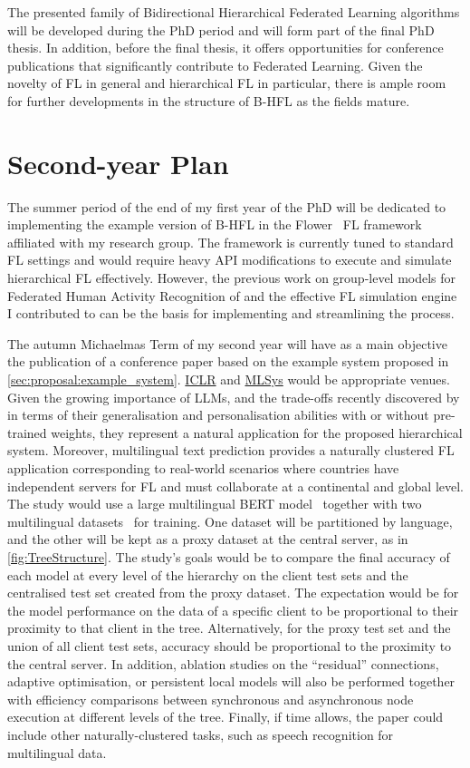 
The presented family of Bidirectional Hierarchical Federated Learning algorithms will be developed during the PhD period and will form part of the final PhD thesis. In addition, before the final thesis, it offers opportunities for conference publications that significantly contribute to Federated Learning. Given the novelty of FL in general and hierarchical FL in particular, there is ample room for further developments in the structure of B-HFL as the fields mature.

\section{Second-year Plan}\label{sec:timeplan:secondYear}
The summer period of the end of my first year of the PhD will be dedicated to implementing the example version of B-HFL in the Flower~\citep{Flower} FL framework affiliated with my research group. The framework is currently tuned to standard FL settings and would require heavy API modifications to execute and simulate hierarchical FL effectively. However, the previous work on group-level models for Federated Human Activity Recognition of \citet{OperaWorkshop} and the effective FL simulation engine I contributed to can be the basis for implementing and streamlining the process.

The autumn Michaelmas Term of my second year will have as a main objective the publication of a conference paper based on the example system proposed in \cref{sec:proposal:example_system}. \href{https://iclr.cc/}{ICLR} and \href{https://mlsys.org/}{MLSys} would be appropriate venues. Given the growing importance of LLMs, and the trade-offs recently discovered by \citet{PersonalisationGeneralisationTradeoff} in terms of their generalisation and personalisation abilities with or without pre-trained weights, they represent a natural application for the proposed hierarchical system. Moreover, multilingual text prediction provides a naturally clustered FL application corresponding to real-world scenarios where countries have independent servers for FL and must collaborate at a continental and global level. The study would use a large multilingual BERT model~\citep{RoBERTA} together with two multilingual datasets~\citep[e.g., ][]{XGLUE,mC4} for training. One dataset will be partitioned by language, and the other will be kept as a proxy dataset at the central server, as in \cref{fig:TreeStructure}. The study's goals would be to compare the final accuracy of each model at every level of the hierarchy on the client test sets and the centralised test set created from the proxy dataset. The expectation would be for the model performance on the data of a specific client to be proportional to their proximity to that client in the tree. Alternatively, for the proxy test set and the union of all client test sets, accuracy should be proportional to the proximity to the central server. In addition, ablation studies on the ``residual'' connections, adaptive optimisation, or persistent local models will also be performed together with efficiency comparisons between synchronous and asynchronous node execution at different levels of the tree. Finally, if time allows, the paper could include other naturally-clustered tasks, such as speech recognition for multilingual data.

